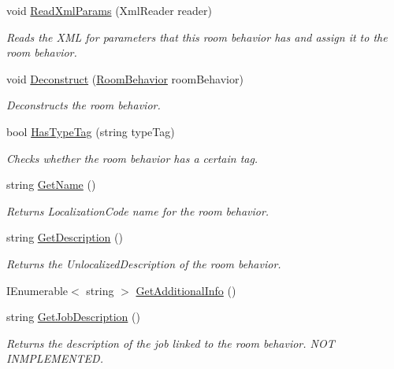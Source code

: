 \begin{DoxyCompactItemize}
void \hyperlink{class_project_porcupine_1_1_rooms_1_1_room_behavior_ae48ef51cb4429bf179c1730bdf5857e7}{Read\+Xml\+Params} (Xml\+Reader reader)
\begin{DoxyCompactList}\small\item\em Reads the X\+ML for parameters that this room behavior has and assign it to the room behavior. \end{DoxyCompactList}\item 
void \hyperlink{class_project_porcupine_1_1_rooms_1_1_room_behavior_a1c385b13b4bee6982fc662ba1cdaf048}{Deconstruct} (\hyperlink{class_project_porcupine_1_1_rooms_1_1_room_behavior}{Room\+Behavior} room\+Behavior)
\begin{DoxyCompactList}\small\item\em Deconstructs the room behavior. \end{DoxyCompactList}\item 
bool \hyperlink{class_project_porcupine_1_1_rooms_1_1_room_behavior_ab8b0bf8d4a930240e5e9acbdc028bf97}{Has\+Type\+Tag} (string type\+Tag)
\begin{DoxyCompactList}\small\item\em Checks whether the room behavior has a certain tag. \end{DoxyCompactList}\item 
string \hyperlink{class_project_porcupine_1_1_rooms_1_1_room_behavior_a1b6f920757fd3485cb0bc59b1101c0fb}{Get\+Name} ()
\begin{DoxyCompactList}\small\item\em Returns Localization\+Code name for the room behavior. \end{DoxyCompactList}\item 
string \hyperlink{class_project_porcupine_1_1_rooms_1_1_room_behavior_a43beeaa1ce08cced8ee7044e8c97a06d}{Get\+Description} ()
\begin{DoxyCompactList}\small\item\em Returns the Unlocalized\+Description of the room behavior. \end{DoxyCompactList}\item 
I\+Enumerable$<$ string $>$ \hyperlink{class_project_porcupine_1_1_rooms_1_1_room_behavior_a5e88494dd23269e902c2f5cbe9442d4c}{Get\+Additional\+Info} ()
\item 
string \hyperlink{class_project_porcupine_1_1_rooms_1_1_room_behavior_a56ddca30811b2815ccf9f3c8045ec4cc}{Get\+Job\+Description} ()
\begin{DoxyCompactList}\small\item\em Returns the description of the job linked to the room behavior. N\+OT I\+N\+M\+P\+L\+E\+M\+E\+N\+T\+ED. \end{DoxyCompactList}\item 

\end{DoxyCompactItemize}

